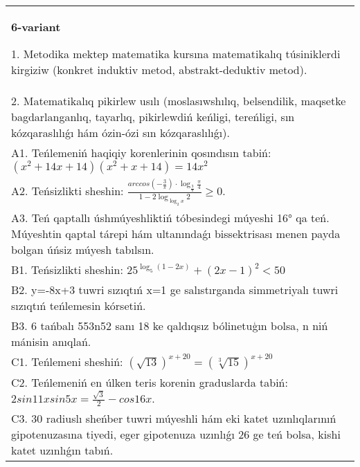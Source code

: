 \documentclass{article}
\begin{document}
\begin{tabular}{m{17cm}}
\textbf{6-variant}

1. Metodika mektep matematika kursına matematikalıq túsiniklerdi kirgiziw (konkret induktiv metod, abstrakt-deduktiv metod). \\
2. Matematikalıq pikirlew usılı (moslasıwshılıq, belsendilik, maqsetke bagdarlanganlıq, tayarlıq, pikirlewdiń keńligi, tereńligi, sın kózqaraslılıǵı hám ózin-ózi sın kózqaraslılıǵı). \\
A1. Teńlemeniń haqiqiy korenlerinin qosındısın tabiń: \((x^2 + 14x + 14) (x^2 + x + 14) = 14x^2\) \\
A2. Teńsizlikti sheshin: \(\frac{arccos (- \frac{3}{\pi}) \cdot \log_{\frac{3}{\pi}}\frac{\pi}{4}}{1 - 2\log_{\log_{2}x}2} \geq 0\). \\
A3. Teń qaptallı úshmúyeshliktiń tóbesindegi múyeshi 16° qa teń. Múyeshtin qaptal tárepi hám ultanındaǵı bissektrisası menen payda bolgan úńsiz múyesh tabılsın. \\
B1. Teńsizlikti sheshin: \(25^{\log_{5}{ (1 - 2x) }} + { (2x - 1) }^{2} < 50\) \\
B2. y=-8x+3 tuwri sızıqtıń x=1 ge salıstırganda simmetriyalı tuwri sızıqtıń teńlemesin kórsetiń. \\
B3. 6 tańbalı 553n52 sanı 18 ke qaldıqsız bólinetuģın bolsa, n niń mánisin anıqlań. \\
C1. Teńlemeni sheshiń: \((\sqrt{13}) ^{x + 20} = (\sqrt[3]{15}) ^{x + 20}\) \\
C2. Teńlemeniń en úlken teris korenin graduslarda tabiń: \(2sin11xsin5x = \frac{\sqrt{3}}{2} - cos16x\). \\
C3. 30 radiuslı sheńber tuwri múyeshli hám eki katet uzınlıqlarınıń gipotenuzasına tiyedi, eger gipotenuza uzınlıǵı 26 ge teń bolsa, kishi katet uzınlıǵın tabıń. \\

\end{tabular}
\vspace{1cm}
\end{document}
